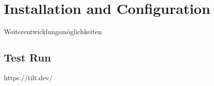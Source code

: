 %
\chapter{Installation and Configuration}

Weiterentwicklungsmöglichkeiten

\section{Test Run}

https://tilt.dev/